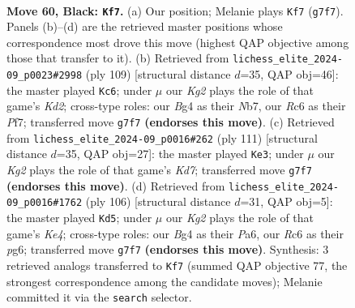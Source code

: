 \documentclass[11pt]{article}
\begin{document}
\clearpage

\begin{figure}[p]\centering
\begin{subfigure}{0.46\textwidth}\centering
\resizebox{\linewidth}{!}{%
\newchessgame
\chessboard[
  setfen={8/6k1/2r5/1R6/4r1bB/6R1/2n2P2/7K b - - 0 60},
  showmover=false,
  pgfstyle=straightmove, color=movearrow, markmove={g7-f7}
]}
\caption{}
\end{subfigure}\hfill
\begin{subfigure}{0.46\textwidth}\centering
\resizebox{\linewidth}{!}{%
\newchessgame
\chessboard[
  setfen={8/Rn1k1p2/8/1r6/3BK3/8/8/8 b - - 12 55},
  showmover=false,
  pgfstyle=straightmove, color=movearrow, markmove={d7-c6}
]}
\caption{}
\end{subfigure}
\\[4pt]
\begin{subfigure}{0.46\textwidth}\centering
\resizebox{\linewidth}{!}{%
\newchessgame
\chessboard[
  setfen={3R4/8/3b1r2/8/4B3/6PK/3k4/8 b - - 19 56},
  showmover=false,
  pgfstyle=straightmove, color=movearrow, markmove={d2-e3}
]}
\caption{}
\end{subfigure}\hfill
\begin{subfigure}{0.46\textwidth}\centering
\resizebox{\linewidth}{!}{%
\newchessgame
\chessboard[
  setfen={R7/6k1/P5p1/2b5/4K3/r7/4N3/8 w - - 8 54},
  showmover=false,
  pgfstyle=straightmove, color=movearrow, markmove={e4-d5}
]}
\caption{}
\end{subfigure}
\caption{\textbf{Move 60, Black: \texttt{Kf7}.} (a) Our position; Melanie plays \texttt{Kf7} (\texttt{g7f7}). Panels (b)--(d) are the retrieved master positions whose correspondence most drove this move (highest QAP objective among those that transfer to it). (b) Retrieved from \texttt{lichess\_elite\_2024-09\_p0023\#2998} (ply 109) [structural distance $d$=35, QAP obj=46]: the master played \texttt{Kc6}; under $\mu$ our \emph{Kg2} plays the role of that game's \emph{Kd2}; cross-type roles: our \emph{B}g4 as their \emph{N}b7, our \emph{R}c6 as their \emph{P}f7; transferred move \texttt{g7f7} \textbf{(endorses this move)}. (c) Retrieved from \texttt{lichess\_elite\_2024-09\_p0016\#262} (ply 111) [structural distance $d$=35, QAP obj=27]: the master played \texttt{Ke3}; under $\mu$ our \emph{Kg2} plays the role of that game's \emph{Kd7}; transferred move \texttt{g7f7} \textbf{(endorses this move)}. (d) Retrieved from \texttt{lichess\_elite\_2024-09\_p0016\#1762} (ply 106) [structural distance $d$=31, QAP obj=5]: the master played \texttt{Kd5}; under $\mu$ our \emph{Kg2} plays the role of that game's \emph{Ke4}; cross-type roles: our \emph{B}g4 as their \emph{P}a6, our \emph{R}c6 as their \emph{p}g6; transferred move \texttt{g7f7} \textbf{(endorses this move)}. Synthesis: 3 retrieved analogs transferred to \texttt{Kf7} (summed QAP objective 77, the strongest correspondence among the candidate moves); Melanie committed it via the \texttt{search} selector.}
\label{fig:thought-m119}
\end{figure}
\end{document}
